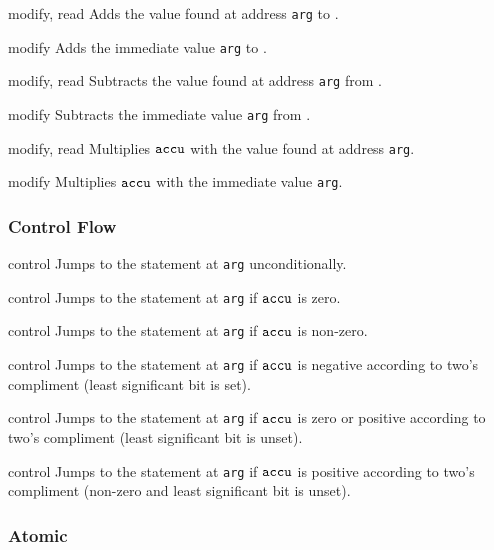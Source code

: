 {}
{modify, read}
{Adds the value found at address \texttt{arg} to \ACCU.}

{}
{modify}
{Adds the immediate value \texttt{arg} to \ACCU.}

{}
{modify, read}
{Subtracts the value found at address \texttt{arg} from \ACCU.}

{}
{modify}
{Subtracts the immediate value \texttt{arg} from \ACCU.}

{}
{modify, read}
{Multiplies $\texttt{accu}$ with the value found at address \texttt{arg}.}

{}
{modify}
{Multiplies $\texttt{accu}$ with the immediate value \texttt{arg}.}


\subsubsection*{Control Flow}


{}
{control}
{Jumps to the statement at \texttt{arg} unconditionally.}

{}
{control}
{Jumps to the statement at \texttt{arg} if $\texttt{accu}$ is zero.}

{}
{control}
{Jumps to the statement at \texttt{arg} if $\texttt{accu}$ is non-zero.}

{}
{control}
{Jumps to the statement at \texttt{arg} if $\texttt{accu}$ is negative according to two's compliment (least significant bit is set).}

{}
{control}
{Jumps to the statement at \texttt{arg} if $\texttt{accu}$ is zero or positive according to two's compliment (least significant bit is unset).}

{}
{control}
{Jumps to the statement at \texttt{arg} if $\texttt{accu}$ is positive according to two's compliment (non-zero and least significant bit is unset).}

\subsubsection*{Atomic}

